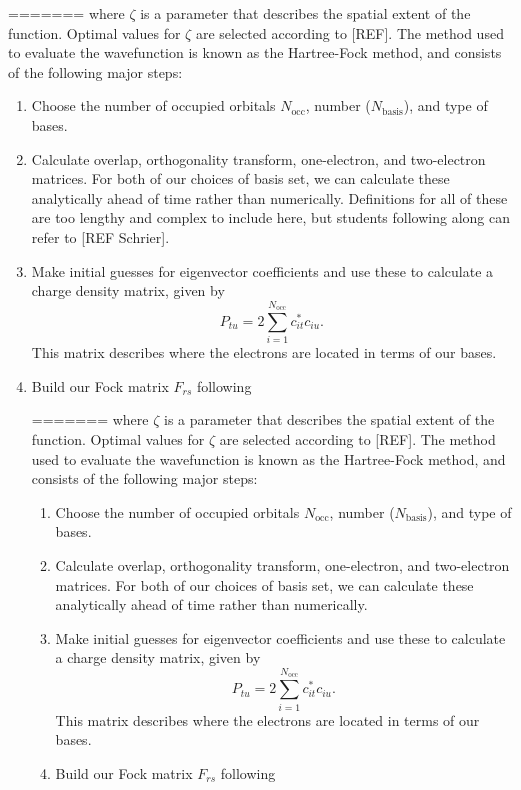 \documentclass[journal=jacsat,manuscript=communication]{achemso}
\begin{document}
=======
where $\zeta$ is a parameter that describes the spatial extent of the function.  Optimal values for $\zeta$ are selected according to [REF].  The method used to evaluate the wavefunction is known as the Hartree-Fock method, and consists of the following major steps:
\begin{enumerate}
	\item Choose the number of occupied orbitals $N_\mathrm{occ}$, number ($N_\mathrm{basis}$), and type of bases.
	\item Calculate overlap, orthogonality transform, one-electron, and two-electron matrices.  For both of our choices of basis set, we can calculate these analytically ahead of time rather than numerically.  Definitions for all of these are too lengthy and complex to include here, but students following along can refer to [REF Schrier].
	\item Make initial guesses for eigenvector coefficients and use these to calculate a charge density matrix, given by
\begin{equation}
	P_{tu} = 2 \sum_{i=1}^{N_{\mathrm{occ}}}c^*_{it}c_{iu}.
\end{equation}
	This matrix describes where the electrons are located in terms of our bases.
	\item Build our Fock matrix $F_{rs}$ following

=======
where $\zeta$ is a parameter that describes the spatial extent of the function.  Optimal values for $\zeta$ are selected according to [REF].  The method used to evaluate the wavefunction is known as the Hartree-Fock method, and consists of the following major steps:
\begin{enumerate}
	\item Choose the number of occupied orbitals $N_\mathrm{occ}$, number ($N_\mathrm{basis}$), and type of bases.
	\item Calculate overlap, orthogonality transform, one-electron, and two-electron matrices.  For both of our choices of basis set, we can calculate these analytically ahead of time rather than numerically.
	\item Make initial guesses for eigenvector coefficients and use these to calculate a charge density matrix, given by
\begin{equation}
	P_{tu} = 2 \sum_{i=1}^{N_{\mathrm{occ}}}c^*_{it}c_{iu}.
\end{equation}
	This matrix describes where the electrons are located in terms of our bases.
	\item Build our Fock matrix $F_{rs}$ following


\end{enumerate}
\end{enumerate}
\end{document}
